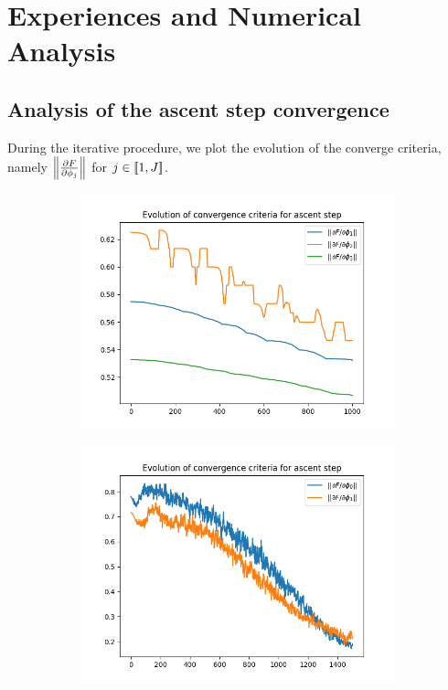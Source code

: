 \section{Experiences and Numerical Analysis}

\subsection{Analysis of the ascent step convergence}

 During the iterative procedure, we plot the evolution of the converge criteria, namely $\left\lVert \frac{\partial F}{\partial \phi_j} \right\rVert$ for $j \in [\![ 1, J ]\!]$. 
\begin{figure}
    \begin{subfigure}{.5\textwidth}
        \centering
        \includegraphics[width=\textwidth]{figures/ascent_criteria_n_samples16000.png}
    \end{subfigure}
    \begin{subfigure}{.5\textwidth}
        \centering
        \includegraphics[width=\textwidth]{figures/ascent_criteria_msamples16000_iter0_1D_2skewnorm.png}
    \end{subfigure}
\end{figure}


